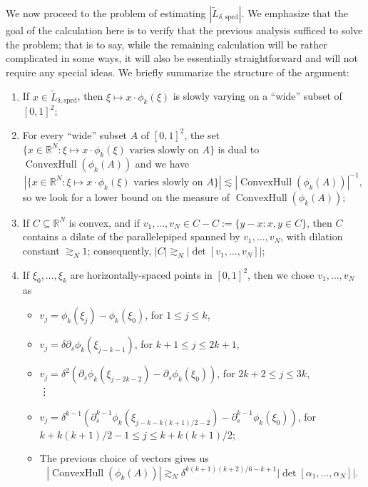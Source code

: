 \documentclass[12pt]{article}
\newcommand{\R}{\mathbb{R}}
\theoremstyle{definition}
\theoremstyle{remark}
\numberwithin{equation}{section}
\begin{document}
We now proceed to the problem of estimating $|\widetilde{L}_{\delta,\mathrm{sprd}}|$. We emphasize that the goal of the calculation here is to verify that the previous analysis sufficed to solve the problem; that is to say, while the remaining calculation will be rather complicated in some ways, it will also be essentially straightforward and will not require any special ideas. 
We briefly summarize the structure of the argument:
\begin{enumerate}
    \item If $x\in\widetilde{L}_{\delta,\mathrm{sprd}}$, then $\xi\mapsto x\cdot \phi_k(\xi)$ is slowly varying on a ``wide'' subset of $[0,1]^2$;
    \item For every ``wide'' subset $A$ of $[0,1]^2$, the set $\{x\in\R^N:\xi\mapsto x\cdot\phi_k(\xi)\text{ varies slowly on $A$}\}$ is dual to $\operatorname{ConvexHull}(\phi_k(A))$ and we have
    \begin{equation*}
        |\{x\in\R^N:\xi\mapsto x\cdot\phi_k(\xi)\text{ varies slowly on $A$}\}|\lesssim |\operatorname{ConvexHull}(\phi_k(A))|^{-1} ,
    \end{equation*}
    so we look for a lower bound on the measure of $\operatorname{ConvexHull}(\phi_k(A))$;
    \item If $C\subseteq\R^N$ is convex, and if $v_1,\ldots,v_N\in C-C:=\{y-x:x,y\in C\}$, then $C$ contains a dilate of the parallelepiped spanned by $v_1,\ldots,v_N$, with dilation constant $\gtrsim_N 1$; consequently, $|C|\gtrsim_N|\det[v_1,\ldots,v_N]|$;
    \item If $\xi_0,\ldots,\xi_k$ are horizontally-spaced points in $[0,1]^2$, then we chose $v_1,\ldots,v_N$ as
    \begin{itemize}
        \item $v_j=\phi_k(\xi_j)-\phi_k(\xi_0)$, for $1\leq j\leq k$,
        \item $v_j=\delta\partial_s\phi_k(\xi_{j-k-1})$, for $k+1\leq j\leq 2k+1$,
        \item $v_j=\delta^2(\partial_s\phi_k(\xi_{j-2k-2})-\partial_s\phi_k(\xi_0))$, for $2k+2\leq j\leq 3k$,
        \\
        \vdots
        \item $v_j=\delta^{k-1}(\partial_s^{k-1}\phi_k(\xi_{j-k-k(k+1)/2-2})-\partial_s^{k-1}\phi_k(\xi_0))$, for $k+k(k+1)/2-1\leq j\leq k+k(k+1)/2$;
        \item The previous choice of vectors gives us \begin{equation*}
        |\operatorname{ConvexHull}(\phi_k(A))|\gtrsim_N \delta^{k(k+1)(k+2)/6-k+1} |\det{[\alpha_1,\dots,\alpha_N]}|.
        \end{equation*}
    \end{itemize}
\end{enumerate}
\end{document}
